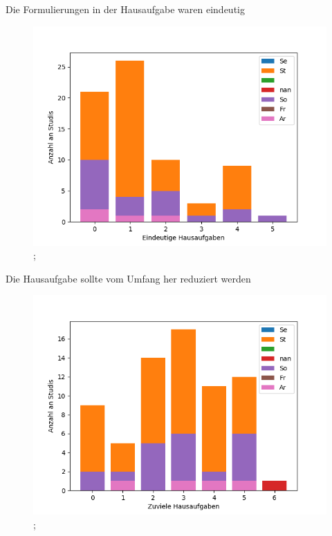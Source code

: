 \documentclass[10pt]{beamer}
\begin{document}
\begin{frame}[fragile]{Die Formulierungen in der Hausaufgabe waren eindeutig} 
 \begin{figure}
 \includegraphics[width= 0.9\linewidth]{./PDFcreater/Plots/SolidEdge/Die+Formulierungen+in+der+Hausaufgabe+waren+eindeutig.png};
 \end{figure}
 \end{frame}
\begin{frame}[fragile]{Die Hausaufgabe sollte vom Umfang her reduziert werden} 
 \begin{figure}
 \includegraphics[width= 0.9\linewidth]{./PDFcreater/Plots/SolidEdge/Die+Hausaufgabe+sollte+vom+Umfang+her+reduziert+werden.png};
 \end{figure}
 \end{frame}
\end{document}
